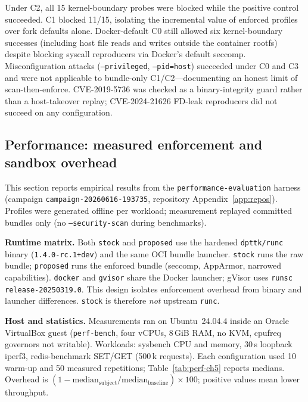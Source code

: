 Under C2, all 15 kernel-boundary probes were blocked while the positive control succeeded. C1 blocked 11/15, isolating the incremental value of enforced profiles over fork defaults alone. Docker-default C0 still allowed six kernel-boundary successes (including host file reads and writes outside the container rootfs) despite blocking syscall reproducers via Docker's default seccomp. Misconfiguration attacks (\texttt{--privileged}, \texttt{--pid=host}) succeeded under C0 and C3 and were not applicable to bundle-only C1/C2---documenting an honest limit of scan-then-enforce. CVE-2019-5736 was checked as a binary-integrity guard rather than a host-takeover replay; CVE-2024-21626 FD-leak reproducers did not succeed on any configuration.

\subsection{Performance: measured enforcement and sandbox overhead}\label{sec:exp-analytical}

This section reports empirical results from the \texttt{performance-evaluation} harness (campaign \texttt{campaign-20260616-193735}, repository Appendix~\ref{app:repos}). Profiles were generated offline per workload; measurement replayed committed bundles only (no \texttt{--security-scan} during benchmarks).

\textbf{Runtime matrix.} Both \texttt{stock} and \texttt{proposed} use the hardened \texttt{dpttk/runc} binary (\texttt{1.4.0-rc.1+dev}) and the same OCI bundle launcher. \texttt{stock} runs the raw bundle; \texttt{proposed} runs the enforced bundle (seccomp, AppArmor, narrowed capabilities). \texttt{docker} and \texttt{gvisor} share the Docker launcher; gVisor uses \texttt{runsc release-20250319.0}. This design isolates enforcement overhead from binary and launcher differences. \texttt{stock} is therefore \emph{not} upstream \texttt{runc}.

\textbf{Host and statistics.} Measurements ran on Ubuntu~24.04.4 inside an Oracle VirtualBox guest (\texttt{perf-bench}, four vCPUs, 8\,GiB RAM, no KVM, cpufreq governors not writable). Workloads: sysbench CPU and memory, 30\,s loopback iperf3, redis-benchmark SET/GET (500\,k requests). Each configuration used 10 warm-up and 50 measured repetitions; Table~\ref{tab:perf-ch5} reports medians. Overhead is $(1 - \mathrm{median}_{\mathrm{subject}}/\mathrm{median}_{\mathrm{baseline}})\times 100$; positive values mean lower throughput.

